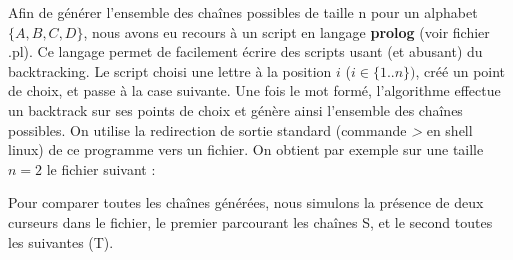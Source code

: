 Afin de générer l'ensemble des chaînes possibles de taille n pour un alphabet $\{A,B,C,D\}$, nous avons eu recours à un script en langage \textbf{prolog} (voir fichier .pl).
Ce langage permet de facilement écrire des scripts usant (et abusant) du backtracking. Le script choisi une lettre à la position $i$ ($i\in \{1..n\})$, créé un point de choix, et passe à la case suivante.
Une fois le mot formé, l'algorithme effectue un backtrack sur ses points de choix et génère ainsi l'ensemble des chaînes possibles. On utilise la redirection de sortie standard (commande \textit{>} en shell linux) de ce programme vers un fichier.
On obtient par exemple sur une taille $n=2$ le fichier suivant :\\
\begin{center}
\end{center}

Pour comparer toutes les chaînes générées, nous simulons la présence de deux curseurs dans le fichier, le premier parcourant les chaînes S, et le second toutes les suivantes (T).